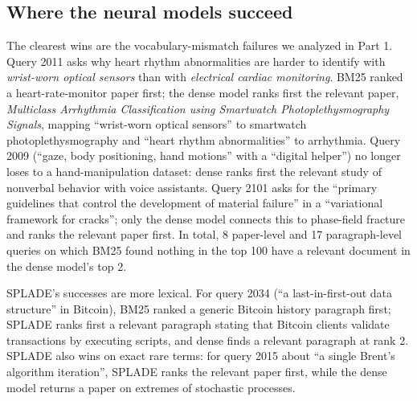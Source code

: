 \documentclass[sigconf,nonacm]{acmart}
\begin{document}
\subsection{Where the neural models succeed}
The clearest wins are the vocabulary-mismatch failures we analyzed in Part 1. Query 2011 asks why heart rhythm abnormalities are harder to identify with \emph{wrist-worn optical sensors} than with \emph{electrical cardiac monitoring}. BM25 ranked a heart-rate-monitor paper first; the dense model ranks first the relevant paper, \emph{Multiclass Arrhythmia Classification using Smartwatch Photoplethysmography Signals}, mapping ``wrist-worn optical sensors'' to smartwatch photoplethysmography and ``heart rhythm abnormalities'' to arrhythmia. Query 2009 (``gaze, body positioning, hand motions'' with a ``digital helper'') no longer loses to a hand-manipulation dataset: dense ranks first the relevant study of nonverbal behavior with voice assistants. Query 2101 asks for the ``primary guidelines that control the development of material failure'' in a ``variational framework for cracks''; only the dense model connects this to phase-field fracture and ranks the relevant paper first. In total, 8 paper-level and 17 paragraph-level queries on which BM25 found nothing in the top 100 have a relevant document in the dense model's top 2.

SPLADE's successes are more lexical. For query 2034 (``a last-in-first-out data structure'' in Bitcoin), BM25 ranked a generic Bitcoin history paragraph first; SPLADE ranks first a relevant paragraph stating that Bitcoin clients validate transactions by executing scripts, and dense finds a relevant paragraph at rank 2. SPLADE also wins on exact rare terms: for query 2015 about ``a single Brent's algorithm iteration'', SPLADE ranks the relevant paper first, while the dense model returns a paper on extremes of stochastic processes.
\end{document}
